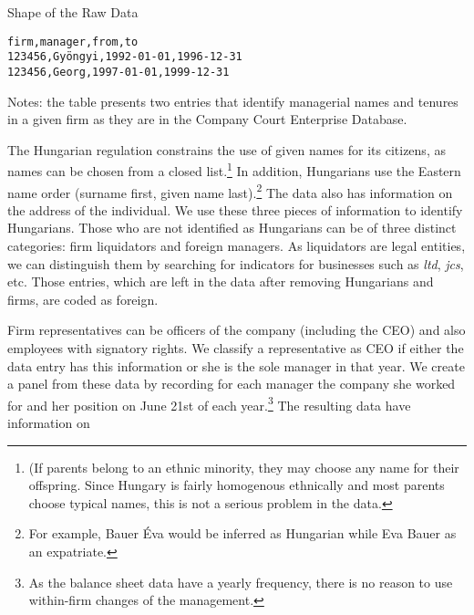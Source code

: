 \documentclass[12pt,a4paper]{article}
\begin{document}
\begin{table}[h!]
\begin{threeparttable}
\caption{Shape of the Raw Data}
\label{table:rawdata}
\centering
\texttt{firm,manager,from,to\\
123456,Gyöngyi,1992-01-01,1996-12-31\\
123456,Georg,1997-01-01,1999-12-31}
\begin{tablenotes}
			\small
      \item {Notes: the table presents two entries that identify managerial names and tenures in a given firm as they are in the Company Court Enterprise Database}.
    \end{tablenotes}
\end{threeparttable}
\end{table}

The Hungarian regulation constrains the use of given names for its citizens, as names can be chosen from a closed list.\footnote{(If parents belong to an ethnic minority, they may choose any name for their offspring. Since Hungary is fairly homogenous ethnically and most parents choose typical names, this is not a serious problem in the data.}  In addition, Hungarians use the Eastern name order (surname first, given name last).\footnote{For example, Bauer Éva would be inferred as Hungarian while Eva Bauer as an expatriate.} The data also has  information on the address of the individual. We use these three pieces of information to identify Hungarians. Those who are not identified as Hungarians can be of three distinct categories: firm liquidators and foreign managers.  As liquidators are legal entities, we can distinguish them by searching for indicators for businesses such as \emph{ltd}, \emph{jcs}, etc. Those entries, which are left in the data after removing Hungarians and firms, are coded as foreign.

Firm representatives can be officers of the company (including the CEO) and also employees with signatory rights.  We classify a representative as CEO if either the data entry has this information or she is the sole manager in that year. We create a panel from these data by recording for each manager the company she worked for and her position on June 21st of each year.\footnote{As the balance sheet data have a yearly frequency, there is no reason to use within-firm changes of the management.} The resulting data have information on %
\end{document}
